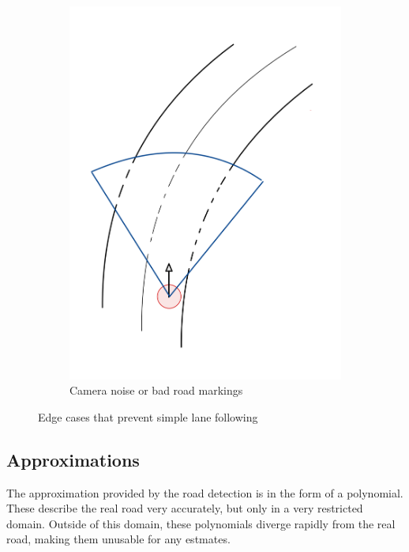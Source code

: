 \begin{figure}
\begin{subfigure}{.24\linewidth}
		\includegraphics[width=\textwidth]{Pictures/road detection noise}
		
		\caption{Camera noise or bad road markings}
	\end{subfigure}


	\caption{Edge cases that prevent simple lane following}
	\label{nav edge case}
\end{figure}



\subsection{Approximations}
The approximation provided by the road detection is in the form of a polynomial. These describe the real road very accurately, but only in a very restricted domain. Outside of this domain, these polynomials diverge rapidly from the real road, making them unusable for any estmates.

